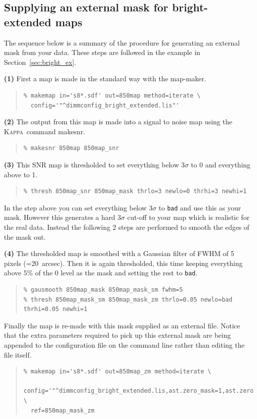 \documentclass[twoside,11pt]{article}
\newcommand{\xref}[3]{#1}
\newcommand{\xlabel}[1]{}
\renewcommand{\_}{\texttt{\symbol{95}}}
\newenvironment{myquote}{\begin{quote}\begin{small}}{\end{small}\end{quote}}
\newcommand{\Kappa}{\xref{\textsc{Kappa}}{sun95}{}}
\newcommand{\task}[1]{\textsf{#1}}
\newcommand{\makesnr}{\xref{\task{makesnr}}{sun95}{MAKESNR}}
\begin{document}
\subsection{\xlabel{maskbe}Supplying an external mask for bright-extended maps}
\label{sec:maskbe}

The sequence below is a summary of the procedure for generating an
external mask from your data. These steps are followed in the example
in Section~\ref{sec:bright_ex}.

\textbf{(1)} First a map is made in the standard way with the map-maker.
\begin{myquote}
\begin{verbatim}
% makemap in='s8*.sdf' out=850map method=iterate \
  config='"^dimmconfig_bright_extended.lis"'
\end{verbatim}
\end{myquote}
\textbf{(2)} The output from this map is made into a signal to noise map using the
\Kappa\ command \makesnr.
\begin{myquote}
\begin{verbatim}
% makesnr 850map 850map_snr
\end{verbatim}
\end{myquote}
\textbf{(3)} This SNR map is thresholded to set everything below 3$\sigma$ to 0 and
everything above to 1.
\begin{myquote}
\begin{verbatim}
% thresh 850map_snr 850map_mask thrlo=3 newlo=0 thrhi=3 newhi=1
\end{verbatim}
\end{myquote}
In the step above you can set everything below 3$\sigma$ to
\texttt{bad} and use this as your mask. However this generates a hard
3$\sigma$ cut-off to your map which is realistic for the real data.
Instead the following 2 steps are performed to smooth the edges of the
mask out.

\textbf{(4)} The thresholded map is smoothed with a Gaussian filter
of FWHM of 5 pixels (=20~arcsec). Then it is again thresholded, this time
keeping everything above 5\% of the 0 level as the mask and setting
the rest to \texttt{bad}.
\begin{myquote}
\begin{verbatim}
% gausmooth 850map_mask 850map_mask_sm fwhm=5
% thresh 850map_mask_sm 850map_mask_zm thrlo=0.05 newlo=bad thrhi=0.05 newhi=1
\end{verbatim}
\end{myquote}
Finally the map is re-made with this mask supplied as an external
file. Notice that the extra parameters required to pick up this external
mask are being appended to the configuration file on the command line
rather than editing the file itself.
\begin{myquote}
\begin{verbatim}
% makemap in='s8*.sdf' out=850map_zm method=iterate \
  config='"^dimmconfig_bright_extended.lis,ast.zero_mask=1,ast.zero_snr=0"' \
  ref=850map_mask_zm
\end{verbatim}
\end{myquote}
\end{document}
